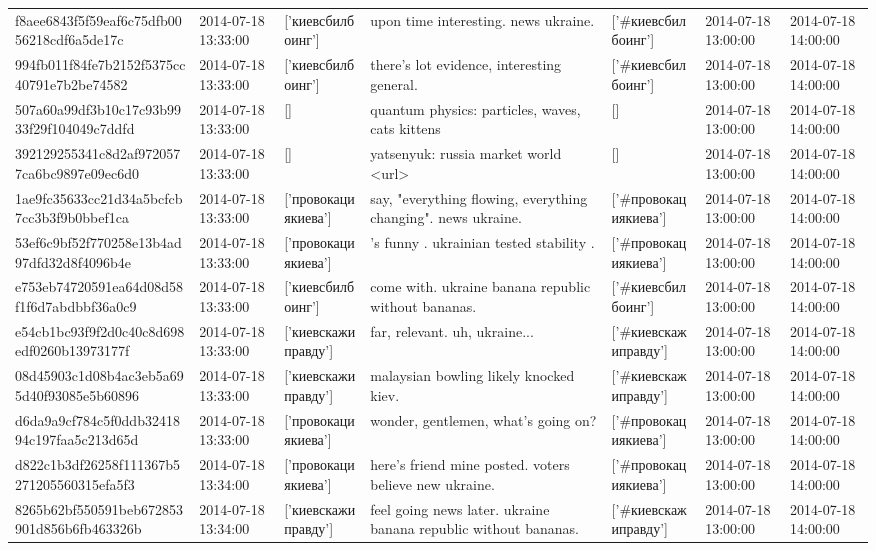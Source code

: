 \begin{tabular}{lllllll}
f8aee6843f5f59eaf6c75dfb0056218cdf6a5de17c & 2014-07-18 13:33:00 & ['киевсбилбоинг'] & upon time interesting. news ukraine. & ['#киевсбилбоинг'] & 2014-07-18 13:00:00 & 2014-07-18 14:00:00 \\
994fb011f84fe7b2152f5375cc40791e7b2be74582 & 2014-07-18 13:33:00 & ['киевсбилбоинг'] & there's lot evidence, interesting general. & ['#киевсбилбоинг'] & 2014-07-18 13:00:00 & 2014-07-18 14:00:00 \\
507a60a99df3b10c17c93b9933f29f104049c7ddfd & 2014-07-18 13:33:00 & [] & quantum physics: particles, waves, cats kittens & [] & 2014-07-18 13:00:00 & 2014-07-18 14:00:00 \\
392129255341c8d2af9720577ca6bc9897e09ec6d0 & 2014-07-18 13:33:00 & [] & yatsenyuk: russia market world <url> & [] & 2014-07-18 13:00:00 & 2014-07-18 14:00:00 \\
1ae9fc35633cc21d34a5bcfcb7cc3b3f9b0bbef1ca & 2014-07-18 13:33:00 & ['провокациякиева'] & say, "everything flowing, everything changing". news ukraine. & ['#провокациякиева'] & 2014-07-18 13:00:00 & 2014-07-18 14:00:00 \\
53ef6c9bf52f770258e13b4ad97dfd32d8f4096b4e & 2014-07-18 13:33:00 & ['провокациякиева'] & 's funny . ukrainian tested stability . & ['#провокациякиева'] & 2014-07-18 13:00:00 & 2014-07-18 14:00:00 \\
e753eb74720591ea64d08d58f1f6d7abdbbf36a0c9 & 2014-07-18 13:33:00 & ['киевсбилбоинг'] & come with. ukraine banana republic without bananas. & ['#киевсбилбоинг'] & 2014-07-18 13:00:00 & 2014-07-18 14:00:00 \\
e54cb1bc93f9f2d0c40c8d698edf0260b13973177f & 2014-07-18 13:33:00 & ['киевскажиправду'] & far, relevant. uh, ukraine... & ['#киевскажиправду'] & 2014-07-18 13:00:00 & 2014-07-18 14:00:00 \\
08d45903c1d08b4ac3eb5a695d40f93085e5b60896 & 2014-07-18 13:33:00 & ['киевскажиправду'] & malaysian bowling likely knocked kiev. & ['#киевскажиправду'] & 2014-07-18 13:00:00 & 2014-07-18 14:00:00 \\
d6da9a9cf784c5f0ddb3241894c197faa5c213d65d & 2014-07-18 13:33:00 & ['провокациякиева'] & wonder, gentlemen, what's going on? & ['#провокациякиева'] & 2014-07-18 13:00:00 & 2014-07-18 14:00:00 \\
d822c1b3df26258f111367b5271205560315efa5f3 & 2014-07-18 13:34:00 & ['провокациякиева'] & here's friend mine posted. voters believe new ukraine. & ['#провокациякиева'] & 2014-07-18 13:00:00 & 2014-07-18 14:00:00 \\
8265b62bf550591beb672853901d856b6fb463326b & 2014-07-18 13:34:00 & ['киевскажиправду'] & feel going news later. ukraine banana republic without bananas. & ['#киевскажиправду'] & 2014-07-18 13:00:00 & 2014-07-18 14:00:00 \\

\end{tabular}
